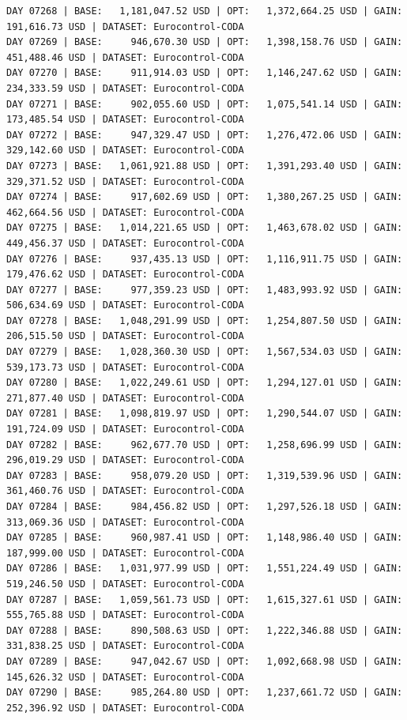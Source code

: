 \documentclass[11pt,a4paper]{article}
\begin{document}
\begin{verbatim}
DAY 07268 | BASE:   1,181,047.52 USD | OPT:   1,372,664.25 USD | GAIN: 191,616.73 USD | DATASET: Eurocontrol-CODA
DAY 07269 | BASE:     946,670.30 USD | OPT:   1,398,158.76 USD | GAIN: 451,488.46 USD | DATASET: Eurocontrol-CODA
DAY 07270 | BASE:     911,914.03 USD | OPT:   1,146,247.62 USD | GAIN: 234,333.59 USD | DATASET: Eurocontrol-CODA
DAY 07271 | BASE:     902,055.60 USD | OPT:   1,075,541.14 USD | GAIN: 173,485.54 USD | DATASET: Eurocontrol-CODA
DAY 07272 | BASE:     947,329.47 USD | OPT:   1,276,472.06 USD | GAIN: 329,142.60 USD | DATASET: Eurocontrol-CODA
DAY 07273 | BASE:   1,061,921.88 USD | OPT:   1,391,293.40 USD | GAIN: 329,371.52 USD | DATASET: Eurocontrol-CODA
DAY 07274 | BASE:     917,602.69 USD | OPT:   1,380,267.25 USD | GAIN: 462,664.56 USD | DATASET: Eurocontrol-CODA
DAY 07275 | BASE:   1,014,221.65 USD | OPT:   1,463,678.02 USD | GAIN: 449,456.37 USD | DATASET: Eurocontrol-CODA
DAY 07276 | BASE:     937,435.13 USD | OPT:   1,116,911.75 USD | GAIN: 179,476.62 USD | DATASET: Eurocontrol-CODA
DAY 07277 | BASE:     977,359.23 USD | OPT:   1,483,993.92 USD | GAIN: 506,634.69 USD | DATASET: Eurocontrol-CODA
DAY 07278 | BASE:   1,048,291.99 USD | OPT:   1,254,807.50 USD | GAIN: 206,515.50 USD | DATASET: Eurocontrol-CODA
DAY 07279 | BASE:   1,028,360.30 USD | OPT:   1,567,534.03 USD | GAIN: 539,173.73 USD | DATASET: Eurocontrol-CODA
DAY 07280 | BASE:   1,022,249.61 USD | OPT:   1,294,127.01 USD | GAIN: 271,877.40 USD | DATASET: Eurocontrol-CODA
DAY 07281 | BASE:   1,098,819.97 USD | OPT:   1,290,544.07 USD | GAIN: 191,724.09 USD | DATASET: Eurocontrol-CODA
DAY 07282 | BASE:     962,677.70 USD | OPT:   1,258,696.99 USD | GAIN: 296,019.29 USD | DATASET: Eurocontrol-CODA
DAY 07283 | BASE:     958,079.20 USD | OPT:   1,319,539.96 USD | GAIN: 361,460.76 USD | DATASET: Eurocontrol-CODA
DAY 07284 | BASE:     984,456.82 USD | OPT:   1,297,526.18 USD | GAIN: 313,069.36 USD | DATASET: Eurocontrol-CODA
DAY 07285 | BASE:     960,987.41 USD | OPT:   1,148,986.40 USD | GAIN: 187,999.00 USD | DATASET: Eurocontrol-CODA
DAY 07286 | BASE:   1,031,977.99 USD | OPT:   1,551,224.49 USD | GAIN: 519,246.50 USD | DATASET: Eurocontrol-CODA
DAY 07287 | BASE:   1,059,561.73 USD | OPT:   1,615,327.61 USD | GAIN: 555,765.88 USD | DATASET: Eurocontrol-CODA
DAY 07288 | BASE:     890,508.63 USD | OPT:   1,222,346.88 USD | GAIN: 331,838.25 USD | DATASET: Eurocontrol-CODA
DAY 07289 | BASE:     947,042.67 USD | OPT:   1,092,668.98 USD | GAIN: 145,626.32 USD | DATASET: Eurocontrol-CODA
DAY 07290 | BASE:     985,264.80 USD | OPT:   1,237,661.72 USD | GAIN: 252,396.92 USD | DATASET: Eurocontrol-CODA

\end{verbatim}
\end{document}
